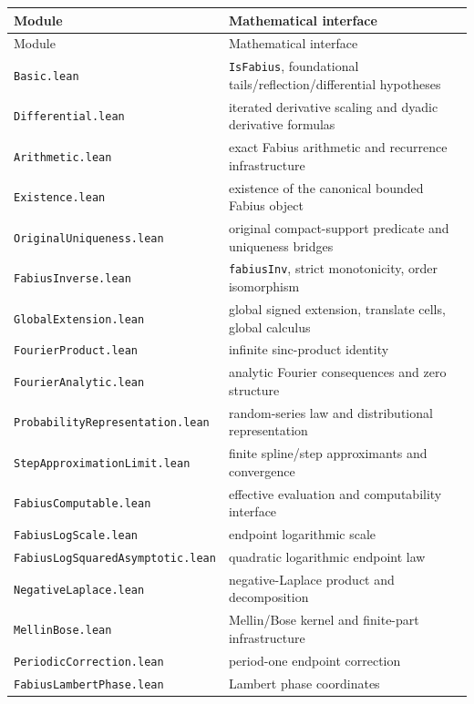 \documentclass[11pt,oneside]{article}
\begin{document}
\begin{longtable}{@{}>{\raggedright\arraybackslash}p{}>{\raggedright\arraybackslash}p{}@{}}
\toprule Module & Mathematical interface\\ \midrule\endfirsthead
\toprule Module & Mathematical interface\\ \midrule\endhead
\nolinkurl{Basic.lean} & \texttt{IsFabius}, foundational tails/reflection/differential hypotheses \\
\nolinkurl{Differential.lean} & iterated derivative scaling and dyadic derivative formulas \\
\nolinkurl{Arithmetic.lean} & exact Fabius arithmetic and recurrence infrastructure \\
\nolinkurl{Existence.lean} & existence of the canonical bounded Fabius object \\
\nolinkurl{OriginalUniqueness.lean} & original compact-support predicate and uniqueness bridges \\
\nolinkurl{FabiusInverse.lean} & \texttt{fabiusInv}, strict monotonicity, order isomorphism \\
\nolinkurl{GlobalExtension.lean} & global signed extension, translate cells, global calculus \\
\nolinkurl{FourierProduct.lean} & infinite sinc-product identity \\
\nolinkurl{FourierAnalytic.lean} & analytic Fourier consequences and zero structure \\
\nolinkurl{ProbabilityRepresentation.lean} & random-series law and distributional representation \\
\nolinkurl{StepApproximationLimit.lean} & finite spline/step approximants and convergence \\
\nolinkurl{FabiusComputable.lean} & effective evaluation and computability interface \\
\nolinkurl{FabiusLogScale.lean} & endpoint logarithmic scale \\
\nolinkurl{FabiusLogSquaredAsymptotic.lean} & quadratic logarithmic endpoint law \\
\nolinkurl{NegativeLaplace.lean} & negative-Laplace product and decomposition \\
\nolinkurl{MellinBose.lean} & Mellin/Bose kernel and finite-part infrastructure \\
\nolinkurl{PeriodicCorrection.lean} & period-one endpoint correction \\
\nolinkurl{FabiusLambertPhase.lean} & Lambert phase coordinates \\

\end{longtable}
\end{document}
